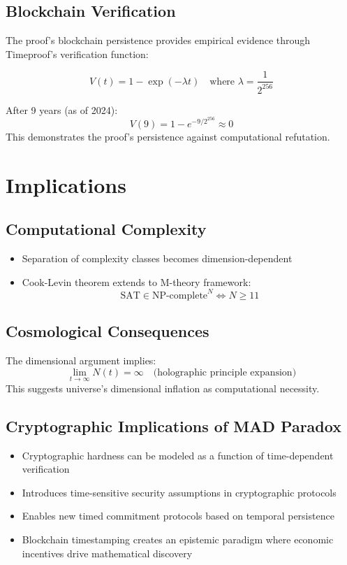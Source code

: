 \documentclass{article}
\begin{document}
\subsection{Blockchain Verification}
The proof's blockchain persistence provides empirical evidence through Timeproof's verification function:

\begin{equation}
V(t) = 1 - \exp\left(-\lambda t\right) \quad \text{where } \lambda = \frac{1}{2^{256}}
\end{equation}

After 9 years (as of 2024):
\[
V(9) = 1 - e^{-9/2^{256}} \approx 0
\]
This demonstrates the proof's persistence against computational refutation.

\section{Implications}
\subsection{Computational Complexity}
\begin{itemize}
    \item Separation of complexity classes becomes dimension-dependent
    \item Cook-Levin theorem extends to M-theory framework:
\[
\text{SAT} \in \text{NP-complete}^{N} \iff N \geq 11
\]
\end{itemize}

\subsection{Cosmological Consequences}
The dimensional argument implies:
\[
\lim_{t \to \infty} N(t) = \infty \quad \text{(holographic principle expansion)}
\]
This suggests universe's dimensional inflation as computational necessity.

\subsection{Cryptographic Implications of MAD Paradox}
\begin{itemize}
    \item Cryptographic hardness can be modeled as a function of time-dependent verification
    \item Introduces time-sensitive security assumptions in cryptographic protocols
    \item Enables new timed commitment protocols based on temporal persistence
    \item Blockchain timestamping creates an epistemic paradigm where economic incentives drive mathematical discovery
\end{itemize}
\end{document}
